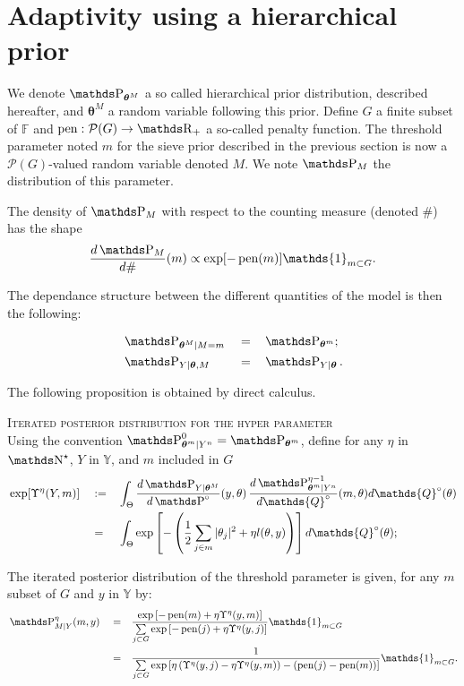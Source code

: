 \section{Adaptivity using a hierarchical prior}\label{BAYES_HIERARCHICAL}

We denote $\P_{\boldsymbol{\theta}^{M}}$ a so called hierarchical prior distribution, described hereafter, and $\boldsymbol{\theta}^{M}$ a random variable following this prior.
Define $G$ a finite subset of $\mathds{F}$ and  $\pen: \mathcal{P}(G) \rightarrow \R_{+}$ a so-called penalty function.
The threshold parameter noted $m$ for the sieve prior described in the previous section is now a $\mathcal{P}(G)$-valued random variable denoted $M$. We note $\P_{M}$ the distribution of this parameter.

The density of $\P_{M}$ with respect to the counting measure (denoted \#) has the shape
\[\frac{d\P_{M}}{d\#}(m) \propto \exp[- \pen(m)] \mathds{1}_{m \subset G}.\]

The dependance structure between the different quantities of the model is then the following:

\begin{alignat*}{3}
& \P_{\boldsymbol{\theta}^{M} \vert M=m} && = && \P_{\boldsymbol{\theta}^{m}};\\
& \P_{Y \vert \boldsymbol{\theta}, M} && = && \P_{Y \vert \boldsymbol{\theta}}.
\end{alignat*}

The following proposition is obtained by direct calculus.

\begin{pr}{\textsc{Iterated posterior distribution for the hyper parameter} \\}\label{PR_BAYES_HIERARCHICAL_ITERATED}
Using the convention $\P_{\boldsymbol{\theta}^{m}\vert Y^{n}}^{0} = \P_{\boldsymbol{\theta}^{m}}$, define for any $\eta$ in $\N^{\star}$, $Y$ in $\mathds{Y}$, and $m$ included in $G$
\begin{alignat*}{3}
& \exp[\Upsilon^{\eta}(Y, m)] &&:=&& \int_{\Theta}\frac{d\P_{Y \vert \boldsymbol{\theta}^{M}}}{d\P^{\circ}}(y, \theta) \, \frac{d\P_{\boldsymbol{\theta}^{m}\vert Y^{n}}^{\eta-1}}{d\mathds{Q}^{\circ}}(m, \theta) d\mathds{Q}^{\circ}(\theta)\\
& && = && \int_{\Theta} \exp\left[ - \left(\frac{1}{2} \sum\limits_{j \in m} \vert \theta_{j} \vert^{2} + \eta l(\theta, y)\right) \right] d\mathds{Q}^{\circ}(\theta);
\end{alignat*}

The iterated posterior distribution of the threshold parameter is given, for any $m$ subset of $G$ and $y$ in $\mathds{Y}$ by:
\begin{alignat*}{3}
&\P_{M \vert Y}^{\eta}(m, y) && = && \frac{\exp\left[-\pen(m) + \eta \Upsilon^{\eta}(y, m)\right]}{\sum\limits_{j \subset G}\exp\left[- \pen(j) + \eta \Upsilon^{\eta}(y, j)\right]} \mathds{1}_{m \subset G}\\
& && = && \frac{1}{\sum\limits_{j \subset G}\exp\left[\eta \left(\Upsilon^{\eta}(y, j) - \eta \Upsilon^{\eta}(y, m)\right) - \left(\pen(j) - \pen(m)\right)\right]} \mathds{1}_{m \subset G}.
\end{alignat*}
\end{pr}

